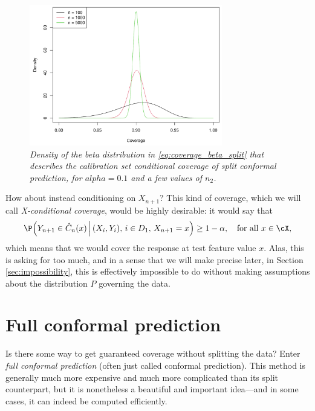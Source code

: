 \documentclass{article}
\begin{document}
\begin{figure}[htb]
\centering
\includegraphics[width=0.75\textwidth]{beta.pdf}
\caption{\it Density of the beta distribution in \eqref{eq:coverage_beta_split}
  that describes the calibration set conditional coverage of split conformal 
  prediction, for $alpha = 0.1$ and a few values of $n_2$.}
\label{fig:beta}
\end{figure}

How about instead conditioning on $X_{n+1}$? This kind of coverage, which we
will call \emph{X-conditional coverage}, would be highly desirable: it would say
that 
\[
\P\Big( Y_{n+1} \in \hC_n(x) \, \Big| \, (X_i,Y_i), \, i \in D_1, \, X_{n+1} = x 
\Big) \geq 1-\alpha, \quad \text{for all $x \in \cX$},
\]
which means that we would cover the response at test feature value $x$. Alas,
this is asking for too much, and in a sense that we will make precise later, in
Section \ref{sec:impossibility}, this is effectively impossible to do without
making assumptions about the distribution $P$ governing the data.

\section{Full conformal prediction}

Is there some way to get guaranteed coverage without splitting the data? Enter 
\emph{full conformal prediction} (often just called conformal prediction). This
method is generally much more expensive and much more complicated than its split
counterpart, but it is nonetheless a beautiful and important idea---and in some
cases, it can indeed be computed efficiently. 
\end{document}
